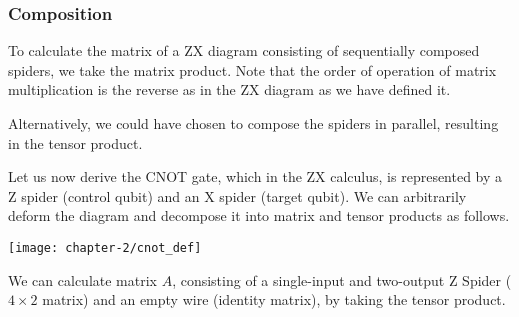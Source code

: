 
\subsubsection{Composition}
To calculate the matrix of a ZX diagram consisting of sequentially composed spiders, we take the matrix product. Note that the order of operation of matrix multiplication is the reverse as in the ZX diagram as we have defined it.


Alternatively, we could have chosen to compose the spiders in parallel, resulting in the tensor product.


Let us now derive the CNOT gate, which in the ZX calculus, is represented by a Z spider (control qubit) and an X spider (target qubit). We can arbitrarily deform the diagram and decompose it into matrix and tensor products as follows.

\begin{center}
    \texttt{[image: chapter-2/cnot\_def]}
\end{center}

We can calculate matrix $A$, consisting of a single-input and two-output Z Spider ($4 \times 2$ matrix) and an empty wire (identity matrix), by taking the tensor product.


